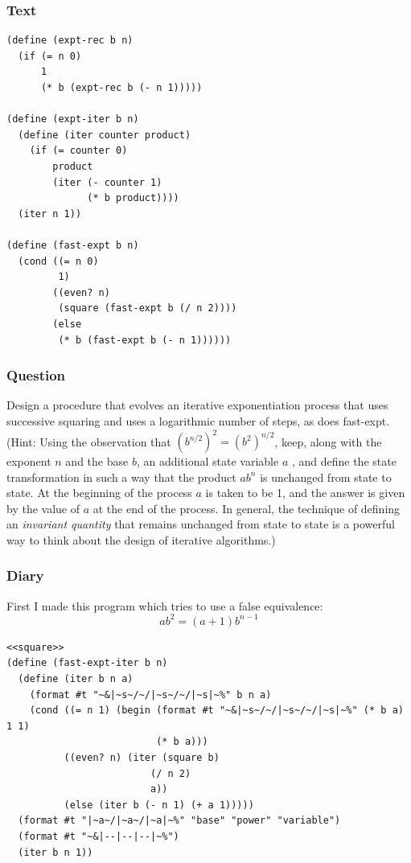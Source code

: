 \documentclass[final,fleqn,titlepage,twoside]{article}
\begin{document}
\subsubsection{Text}
\label{sec:org0d9b39a}
\begin{verbatim}
(define (expt-rec b n)
  (if (= n 0) 
      1 
      (* b (expt-rec b (- n 1)))))

(define (expt-iter b n) 
  (define (iter counter product)
    (if (= counter 0)
        product
        (iter (- counter 1)
              (* b product))))
  (iter n 1))

(define (fast-expt b n)
  (cond ((= n 0) 
         1)
        ((even? n) 
         (square (fast-expt b (/ n 2))))
        (else 
         (* b (fast-expt b (- n 1))))))
\end{verbatim}

\subsubsection{Question}
\label{sec:org7407b29}
Design a procedure that evolves an iterative exponentiation process that uses
successive squaring and uses a logarithmic number of steps, as does fast-expt.
(Hint: Using the observation that \((b^{n/2})^2=(b^2)^{n/2}\), keep, along with
the exponent \(n\) and the base \(b\), an additional state variable \(a\) , and
define the state transformation in such a way that the product \({ab}^n\) is
unchanged from state to state. At the beginning of the process \(a\) is taken to
be 1, and the answer is given by the value of \(a\) at the end of the process.
In general, the technique of defining an \emph{invariant quantity} that remains
unchanged from state to state is a powerful way to think about the design of
iterative algorithms.)

\subsubsection{Diary}
\label{sec:org81fd6fa}
First I made this program which tries to use a false equivalence:
\[ab^2 = (a + 1)b^{n - 1}\]
\begin{verbatim}
<<square>>
(define (fast-expt-iter b n)
  (define (iter b n a)
    (format #t "~&|~s~/~/|~s~/~/|~s|~%" b n a)
    (cond ((= n 1) (begin (format #t "~&|~s~/~/|~s~/~/|~s|~%" (* b a) 1 1)
                          (* b a)))
          ((even? n) (iter (square b)
                         (/ n 2)
                         a))
          (else (iter b (- n 1) (+ a 1)))))
  (format #t "|~a~/|~a~/|~a|~%" "base" "power" "variable")
  (format #t "~&|--|--|--|~%")
  (iter b n 1))
\end{verbatim}
\end{document}
